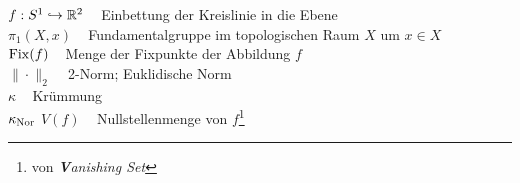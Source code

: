 $f:S^1 \hookrightarrow \mathbb{R}^2\;\;\;$ Einbettung der Kreislinie in die Ebene\\
$\pi_1(X,x)\;\;\;$ Fundamentalgruppe im topologischen Raum $X$ um $x \in X$\\
$\operatorname{Fix}(f)\;\;\;$ Menge der Fixpunkte der Abbildung $f$\\
$\|\cdot\|_2\;\;\;$ 2-Norm; Euklidische Norm\\
$\kappa\;\;\;$ Krümmung\\
$\kappa_{\textnormal{Nor}}$
$V(f)\;\;\;$ Nullstellenmenge von $f$\footnote{von \textit{\textbf{V}anishing Set}}

